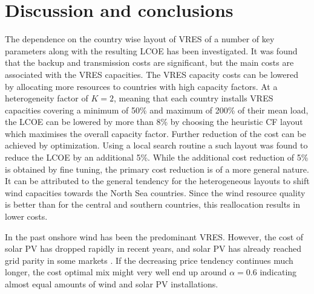\documentclass[a4paper, 5p, sort&compress]{elsarticle}%
\begin{document}
{%
\section{Discussion and conclusions}
\label{sec:four}

The dependence on the country wise layout of VRES of a number of key
parameters along with the resulting LCOE has been investigated. It was
found that the backup and transmission costs are significant, but the
main costs are associated with the VRES capacities. The VRES capacity
costs can be lowered by allocating more resources to countries with
high capacity factors. At a heterogeneity factor of $K = 2$, meaning
that each country installs VRES capacities covering a minimum of 50\%
and maximum of 200\% of their mean load, the LCOE can be lowered by
more than 8\% by choosing the heuristic CF layout which maximises the
overall capacity factor. Further reduction of the cost can be achieved
by optimization. Using a local search routine a such layout was found
to reduce the LCOE by an additional 5\%. While the additional cost
reduction of 5\% is obtained by fine tuning, the primary cost
reduction is of a more general nature. It can be attributed to the
general tendency for the heterogeneous layouts to shift wind
capacities towards the North Sea countries. Since the wind resource
quality is better than for the central and southern countries, this
reallocation results in lower costs.

In the past onshore wind has been the predominant VRES. However, the
cost of solar PV has dropped rapidly in recent years, and solar PV has
already reached grid parity in some markets \cite{solarGridParity}. If
the decreasing price tendency continues much longer, the cost optimal
mix might very well end up around $\alpha = 0.6$ indicating almost equal
amounts of wind and solar PV installations.



}
\end{document}
